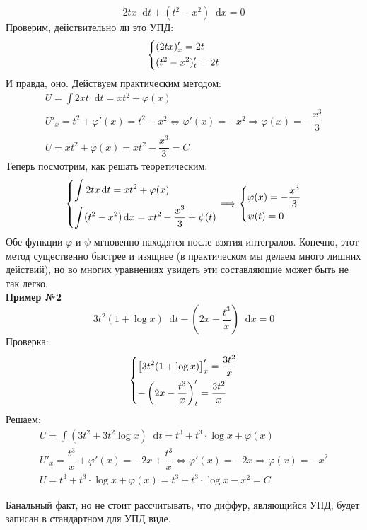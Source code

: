 \documentclass[a4paper,12pt]{article}
\renewcommand*\d{\mathop{}\!\mathrm{d}}
\newcommand{\fe}{\varphi}
\newcommand{\ds}{\displaystyle}
\begin{document}
\[2tx\d t + (t^2 - x^2)\d x = 0\]
Проверим, действительно ли это УПД:
\[\left\{\begin{gathered}
(2tx)'_x = 2t\hfill\\
(t^2 - x^2)'_t = 2t\hfill
\end{gathered}\right.\]
И правда, оно. Действуем практическим методом:
\begin{gather*}
	U = \ds\int 2xt\d t = xt^2 + \fe(x)\\
	U'_x = t^2 + \fe'(x) = t^2 - x^2 \iff \fe'(x) = -x^2 \Longrightarrow \fe(x) = -\dfrac{x^3}{3}\\
	U = xt^2 + \fe(x) = xt^2 - \dfrac{x^3}{3} = C
\end{gather*}
Теперь посмотрим, как решать теоретическим:
\begin{gather*}
\left\{\begin{gathered}
\ds\int 2tx\d t = xt^2 + \fe(x)\hfill\\
\ds\int (t^2 - x^2)\d x = xt^2 - \dfrac{x^3}{3} + \psi(t)\hfill
\end{gathered}\right. \Longrightarrow \left\{\begin{gathered}
\fe(x) = -\dfrac{x^3}{3}\hfill\\ \psi(t) = 0\hfill
\end{gathered}\right.
\end{gather*}
Обе функции $\fe$ и $\psi$ мгновенно находятся после взятия интегралов. Конечно, этот метод существенно быстрее и изящнее (в практическом мы делаем много лишних действий), но во многих уравнениях увидеть эти составляющие может быть не так легко.
\ \\

\textbf{Пример №2}
\[3t^2(1 + \log x)\d t - \left(2x - \dfrac{t^3}{x}\right)\d x = 0\]
Проверка:
\[\left\{\begin{gathered}
\left[3t^2(1 + \log x)\right]'_x  = \dfrac{3t^2}{x}\hfill\\
-\left(2x - \dfrac{t^3}{x}\right)'_t = \dfrac{3t^2}{x}\hfill
\end{gathered}\right.\]
Решаем:
\begin{gather*}
	U = \ds\int \left(3t^2 + 3t^2\log x\right)\d t = t^3 + t^3 \cdot \log x + \fe(x)\\
	U'_x = \dfrac{t^3}{x} + \fe'(x) = -2x + \dfrac{t^3}{x} \iff \fe'(x) = -2x \Longrightarrow \fe(x) = -x^2\\
	U = t^3 + t^3 \cdot \log x + \fe(x) = t^3 + t^3 \cdot \log x - x^2 = C
\end{gather*}

Банальный факт, но не стоит рассчитывать, что диффур, являющийся УПД, будет записан в стандартном для УПД виде.
\ \\
\end{document}
